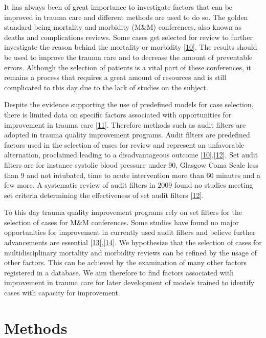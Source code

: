 \documentclass[
]{article}
\begin{document}
It has always been of great importance to investigate factors that can
be improved in trauma care and different methods are used to do so. The
golden standard being mortality and morbidity (M\&M) conferences, also
known as deaths and complications reviews. Some cases get selected for
review to further investigate the reason behind the mortality or
morbidity {[}\protect\hyperlink{ref-WHO2009}{10}{]}. The results should
be used to improve the trauma care and to decrease the amount of
preventable errors. Although the selection of patients is a vital part
of these conferences, it remains a process that requires a great amount
of resources and is still complicated to this day due to the lack of
studies on the subject.

Despite the evidence supporting the use of predefined models for case
selection, there is limited data on specific factors associated with
opportunities for improvement in trauma care
{[}\protect\hyperlink{ref-Slater2020}{11}{]}. Therefore methods such as
audit filters are adopted in trauma quality improvement programs. Audit
filters are predefined factors used in the selection of cases for review
and represent an unfavorable alternation, proclaimed leading to a
disadvantageous outcome
{[}\protect\hyperlink{ref-WHO2009}{10}{]},{[}\protect\hyperlink{ref-Evans2009}{12}{]}.
Set audit filters are for instance systolic blood pressure under 90,
Glasgow Coma Scale less than 9 and not intubated, time to acute
intervention more than 60 minutes and a few more. A systematic review of
audit filters in 2009 found no studies meeting set criteria determining
the effectiveness of set audit filters
{[}\protect\hyperlink{ref-Evans2009}{12}{]}.

To this day trauma quality improvement programs rely on set filters for
the selection of cases for M\&M conferences. Some studies have found no
major opportunities for improvement in currently used audit filters and
believe further advancements are essential
{[}\protect\hyperlink{ref-Cryer1996}{13}{]},{[}\protect\hyperlink{ref-Copes1995}{14}{]}.
We hypothesize that the selection of cases for multidisciplinary
mortality and morbidity reviews can be refined by the usage of other
factors. This can be achieved by the examination of many other factors
registered in a database. We aim therefore to find factors associated
with improvement in trauma care for later development of models trained
to identify cases with capacity for improvement.

\hypertarget{methods}{%
\section{Methods}\label{methods}}
\end{document}

